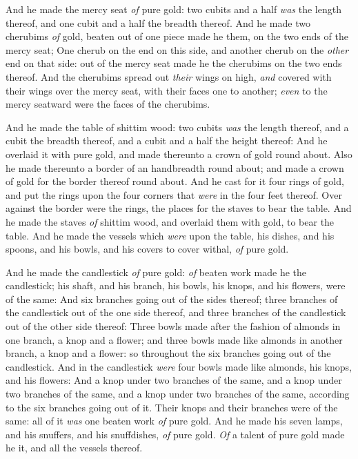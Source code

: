 \documentclass[11pt,letterpaper,oneside]{memoir}
\begin{document}
And he made the mercy seat \emph{of} pure gold: two cubits and a half
\emph{was} the length thereof, and one cubit and a half the breadth
thereof. And he made two cherubims \emph{of} gold, beaten out of one
piece made he them, on the two ends of the mercy seat; One cherub on the
end on this side, and another cherub on the \emph{other} end on that
side: out of the mercy seat made he the cherubims on the two ends
thereof. And the cherubims spread out \emph{their} wings on high,
\emph{and} covered with their wings over the mercy seat, with their
faces one to another; \emph{even }to the mercy seatward were the faces
of the cherubims.

And he made the table of shittim wood: two cubits \emph{was} the length
thereof, and a cubit the breadth thereof, and a cubit and a half the
height thereof: And he overlaid it with pure gold, and made thereunto a
crown of gold round about. Also he made thereunto a border of an
handbreadth round about; and made a crown of gold for the border thereof
round about. And he cast for it four rings of gold, and put the rings
upon the four corners that \emph{were} in the four feet thereof. Over
against the border were the rings, the places for the staves to bear the
table. And he made the staves \emph{of} shittim wood, and overlaid them
with gold, to bear the table. And he made the vessels which \emph{were}
upon the table, his dishes, and his spoons, and his bowls, and his
covers to cover withal, \emph{of} pure gold.

And he made the candlestick \emph{of} pure gold: \emph{of} beaten work
made he the candlestick; his shaft, and his branch, his bowls, his
knops, and his flowers, were of the same: And six branches going out of
the sides thereof; three branches of the candlestick out of the one side
thereof, and three branches of the candlestick out of the other side
thereof: Three bowls made after the fashion of almonds in one branch, a
knop and a flower; and three bowls made like almonds in another branch,
a knop and a flower: so throughout the six branches going out of the
candlestick. And in the candlestick \emph{were} four bowls made like
almonds, his knops, and his flowers: And a knop under two branches of
the same, and a knop under two branches of the same, and a knop under
two branches of the same, according to the six branches going out of it.
Their knops and their branches were of the same: all of it \emph{was}
one beaten work \emph{of} pure gold. And he made his seven lamps, and
his snuffers, and his snuffdishes, \emph{of} pure gold. \emph{Of} a
talent of pure gold made he it, and all the vessels thereof.
\end{document}
